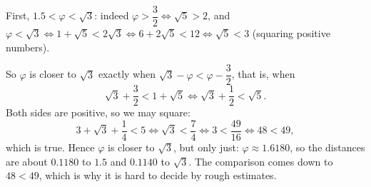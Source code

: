 First, $1.5<\varphi<\sqrt3$: indeed $\varphi>\dfrac{3}{2}\iff\sqrt5>2$, and $\varphi<\sqrt3\iff1+\sqrt5<2\sqrt3\iff6+2\sqrt5<12\iff\sqrt5<3$ (squaring positive numbers).

So $\varphi$ is closer to $\sqrt3$ exactly when $\sqrt3-\varphi<\varphi-\dfrac{3}{2}$, that is, when
\[\sqrt3+\dfrac{3}{2}<1+\sqrt5\iff\sqrt3+\dfrac{1}{2}<\sqrt5.\]
Both sides are positive, so we may square:
\[3+\sqrt3+\dfrac{1}{4}<5\iff\sqrt3<\dfrac{7}{4}\iff3<\dfrac{49}{16}\iff48<49,\]
which is true. Hence $\varphi$ is closer to $\boxed{\sqrt3}$, but only just: $\varphi\approx1.6180$, so the distances are about $0.1180$ to $1.5$ and $0.1140$ to $\sqrt3$. The comparison comes down to $48<49$, which is why it is hard to decide by rough estimates.
